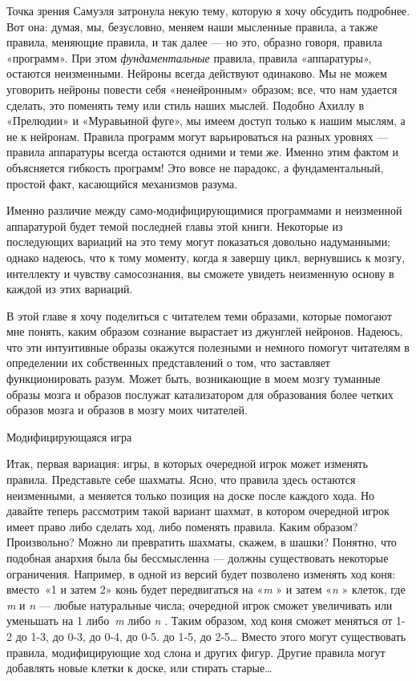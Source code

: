 \documentclass[../main.tex]{subfiles}
\begin{document}
Точка зрения Самуэля затронула некую тему, которую я хочу обсудить подробнее. Вот она: думая, мы, безусловно, меняем наши мысленные правила, а также правила, меняющие правила, и так далее --- но это, образно говоря, правила «программ». При этом \emph{фундаментальные} правила, правила «аппаратуры», остаются неизменными. Нейроны всегда действуют одинаково. Мы не можем уговорить нейроны повести себя «ненейронным» образом; все, что нам удается сделать, это поменять тему или стиль наших мыслей. Подобно Ахиллу в «Прелюдии» и «Муравьиной фуге», мы имеем доступ только к нашим мыслям, а не к нейронам. Правила программ могут варьироваться на разных уровнях --- правила аппаратуры всегда остаются одними и теми же. Именно этим фактом и объясняется гибкость программ! Это вовсе не парадокс, а фундаментальный, простой факт, касающийся механизмов разума.

Именно различие между само-модифицирующимися программами и неизменной аппаратурой будет темой последней главы этой книги. Некоторые из последующих вариаций на это тему могут показаться довольно надуманными; однако надеюсь, что к тому моменту, когда я завершу цикл, вернувшись к мозгу, интеллекту и чувству самосознания, вы сможете увидеть неизменную основу в каждой из этих вариаций.

В этой главе я хочу поделиться с читателем теми образами, которые помогают мне понять, каким образом сознание вырастает из джунглей нейронов. Надеюсь, что эти интуитивные образы окажутся полезными и немного помогут читателям в определении их собственных представлений о том, что заставляет функционировать разум. Может быть, возникающие в моем мозгу туманные образы мозга и образов послужат катализатором для образования более четких образов мозга и образов в мозгу моих читателей.

Модифицирующаяся игра

Итак, первая вариация: игры, в которых очередной игрок может изменять правила. Представьте себе шахматы. Ясно, что правила здесь остаются неизменными, а меняется только позиция на доске после каждого хода. Но давайте теперь рассмотрим такой вариант шахмат, в котором очередной игрок имеет право либо сделать ход, либо поменять правила. Каким образом? Произвольно? Можно ли превратить шахматы, скажем, в шашки? Понятно, что подобная анархия была бы бессмысленна --- должны существовать некоторые ограничения. Например, в одной из версий будет позволено изменять ход коня: вместо~«1 и затем 2» конь будет передвигаться на «\emph{m} » и затем «\emph{n} » клеток, где \emph{m} и \emph{n} --- любые натуральные числа; очередной игрок сможет увеличивать или уменьшать на 1 либо~\emph{m} либо \emph{n} . Таким образом, ход коня сможет меняться от 1-2 до 1-3, до 0-3, до 0-4, до 0-5. до 1-5, до 2-5\ldots{} Вместо этого могут существовать правила, модифицирующие ход слона и других фигур. Другие правила могут добавлять новые клетки к доске, или стирать старые\ldots{}
\end{document}
